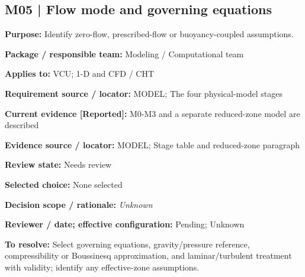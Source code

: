 \documentclass[11pt]{article}
\begin{document}
\begin{minipage}{\textwidth}\small\setlength{\parskip}{2pt}
\subsection*{M05 | Flow mode and governing equations}
\textbf{Purpose:} Identify zero-flow, prescribed-flow or buoyancy-coupled assumptions.\par
\textbf{Package / responsible team:} Modeling / Computational team\par
\textbf{Applies to:} VCU; 1-D and CFD / CHT\par
\textbf{Requirement source / locator:} MODEL; The four physical-model stages\par
\textbf{Current evidence [Reported]:} M0-M3 and a separate reduced-zone model are described\par
\textbf{Evidence source / locator:} MODEL; Stage table and reduced-zone paragraph\par
\textbf{Review state:} Needs review\par
\textbf{Selected choice:} None selected\par
\textbf{Decision scope / rationale:} \textit{Unknown}\par
\textbf{Reviewer / date; effective configuration:} Pending; Unknown\par
\textbf{To resolve:} Select governing equations, gravity/pressure reference, compressibility or Boussinesq approximation, and laminar/turbulent treatment with validity; identify any effective-zone assumptions.\par
\end{minipage}\par\vspace{5pt}
\end{document}
